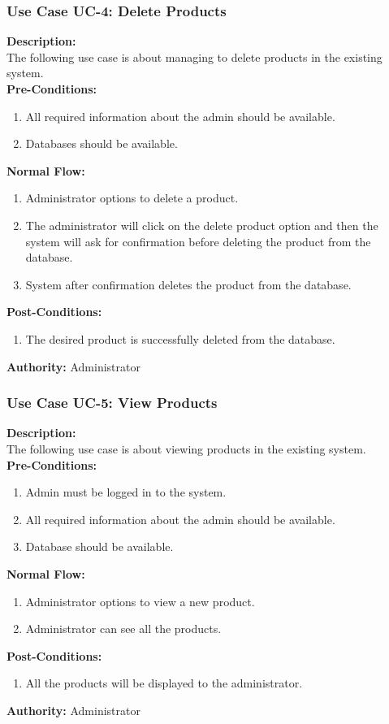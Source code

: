 \subsubsection{ Use Case UC-4: Delete Products}
\textbf{Description:}\\
The following use case is about managing to delete products in the existing system.\\
\textbf{Pre-Conditions:}
\begin{enumerate}
    \item  All required information about the admin should be available.
    \item Databases should be available.
\end{enumerate}
\textbf{Normal Flow:}\\
\begin{enumerate}
\item Administrator options to delete a product.
\item The administrator will click on the delete product option and then the system will ask for confirmation before deleting the product from the database.
\item System after confirmation deletes the product from the database.
\end{enumerate}
\textbf{Post-Conditions: }
\begin{enumerate}
\item	The desired product is successfully deleted from the database.
\end{enumerate}
\textbf{Authority:}
Administrator
\subsubsection{ Use Case UC-5: View Products}
\textbf{Description:}\\
The following use case is about viewing products in the existing system.
\\
\textbf{Pre-Conditions:}
\begin{enumerate}
    \item Admin must be logged in to the system.
    \item  All required information about the admin should be available.
    \item Database should be available.
\end{enumerate}
\textbf{Normal Flow:}\\
\begin{enumerate}
\item Administrator options to view a new product.
\item Administrator can see all the products.
\end{enumerate}
\textbf{Post-Conditions: }
\begin{enumerate}
\item	All the products will be displayed to the administrator.
\end{enumerate}
\textbf{Authority:}
Administrator
